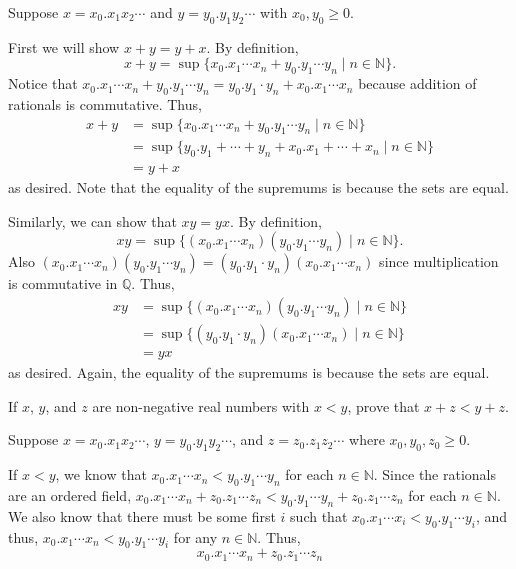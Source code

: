 \documentclass[12 pt, letterpaper]{hmcpset}
\begin{document}
\begin{solution}
	Suppose $x = x_{0}.x_{1} x_{2} \cdots$ and $y = y_{0}.y_{1} y_{2} \cdots$ with $x_{0}, y_{0} \ge 0$.

	First we will show $x + y = y + x$. By definition,
	\[
		x + y = \sup \{ x_{0}.x_{1} \cdots x_{n} + y_{0}.y_{1} \cdots y_{n} \mid n \in \mathbb{N} \}.
	\]
	Notice that $x_{0}.x_{1} \cdots x_{n} + y_{0}.y_{1} \cdots y_{n} = y_{0}.y_{1} \cdot y_{n} + x_{0}.x_{1} \cdots x_{n}$ because addition of rationals is commutative. Thus,
	 \[
		\begin{split}
			x + y & = \sup \{ x_{0}.x_{1} \cdots x_{n} + y_{0}.y_{1} \cdots y_{n} \mid n \in \mathbb{N} \} \\
			      & = \sup \{ y_{0}.y_{1} + \cdots + y_{n} + x_{0}.x_{1} + \cdots + x_{n} \mid n \in \mathbb{N} \} \\
			      & = y + x
		\end{split}
	\]
	as desired. Note that the equality of the supremums is because the sets are equal.

	Similarly, we can show that $xy = yx$. By definition,
	\[
		xy = \sup \{ (x_{0}.x_{1} \cdots x_{n})(y_{0}.y_{1} \cdots y_{n}) \mid n \in \mathbb{N} \}.
	\]
	Also $(x_{0}.x_{1} \cdots x_{n}) (y_{0}.y_{1} \cdots y_{n}) = (y_{0}.y_{1} \cdot y_{n}) (x_{0}.x_{1} \cdots x_{n})$ since multiplication is commutative in $\mathbb{Q}$. Thus,
	\[
		\begin{split}
			xy & = \sup \{ (x_{0}.x_{1} \cdots x_{n})(y_{0}.y_{1} \cdots y_{n}) \mid n \in \mathbb{N} \} \\
			      & = \sup \{ (y_{0}.y_{1} \cdot y_{n}) (x_{0}.x_{1} \cdots x_{n}) \mid n \in \mathbb{N} \} \\
			      & = yx
		\end{split}
	\]
	as desired. Again, the equality of the supremums is because the sets are equal.
\end{solution}

\pagebreak

\begin{problem}[3.]
	If $x$, $y$, and $z$ are non-negative real numbers with $x < y$, prove that $x + z < y + z$.
\end{problem}

\begin{solution}
	Suppose $x = x_{0}.x_{1} x_{2} \cdots$, $y = y_{0}.y_{1} y_{2} \cdots$, and  $z = z_{0}.z_{1} z_{2} \cdots$ where $x_{0}, y_{0}, z_{0} \ge 0$.

	If $x < y$, we know that $x_{0}.x_{1} \cdots x_{n} < y_{0}.y_{1} \cdots y_{n}$ for each $n \in \mathbb{N}$. Since the rationals are an ordered field, $x_{0}.x_{1} \cdots x_{n} + z_{0}.z_{1} \cdots z_{n} < y_{0}.y_{1} \cdots y_{n} + z_{0}.z_{1} \cdots z_{n}$ for each $n \in \mathbb{N}$. We also know that there must be some first $i$ such that $x_{0}.x_{1} \cdots x_{i} < y_{0}.y_{1} \cdots y_{i}$, and thus, $x_{0}.x_{1} \cdots x_{n} < y_{0}.y_{1} \cdots y_{i}$ for any $n \in \mathbb{N}$. Thus,
	\[
		x_{0}.x_{1} \cdots x_{n} + z_{0}.z_{1} \cdots z_{n}
	\]
\end{solution}
\end{document}
